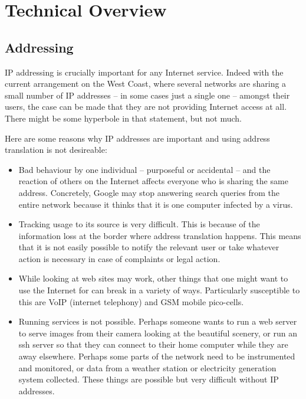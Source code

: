 \section{Technical Overview}

\subsection{Addressing}

IP addressing is crucially important for any Internet service. Indeed
with the current arrangement on the West Coast, where several networks
are sharing a small number of IP addresses -- in some cases just a
single one -- amongst their users, the case can be made that they are
not providing Internet access at all. There might be some hyperbole in
that statement, but not much.

Here are some reasons why IP addresses are important and using address
translation is not desireable:
\begin{itemize}
  \item Bad behaviour by one individual -- purposeful or accidental --
    and the reaction of others on the Internet affects everyone who is
    sharing the same address. Concretely, Google may stop answering
    search queries from the entire network because it thinks that it
    is one computer infected by a virus.
  \item Tracking usage to its source is very difficult. This is
    because of the information loss at the border where address
    translation happens. This means that it is not easily possible to
    notify the relevant user or take whatever action is necessary in
    case of complaints or legal action.
  \item While looking at web sites may work, other things that one
    might want to use the Internet for can break in a variety of
    ways. Particularly susceptible to this are VoIP (internet
    telephony) and GSM mobile pico-cells.
  \item Running services is not possible. Perhaps someone wants to run
    a web server to serve images from their camera looking at the
    beautiful scenery, or run an ssh server so that they can connect
    to their home computer while they are away elsewhere. Perhaps some
    parts of the network need to be instrumented and monitored, or
    data from a weather station or electricity generation system
    collected. These things are possible but very difficult without IP
    addresses.
\end{itemize}

